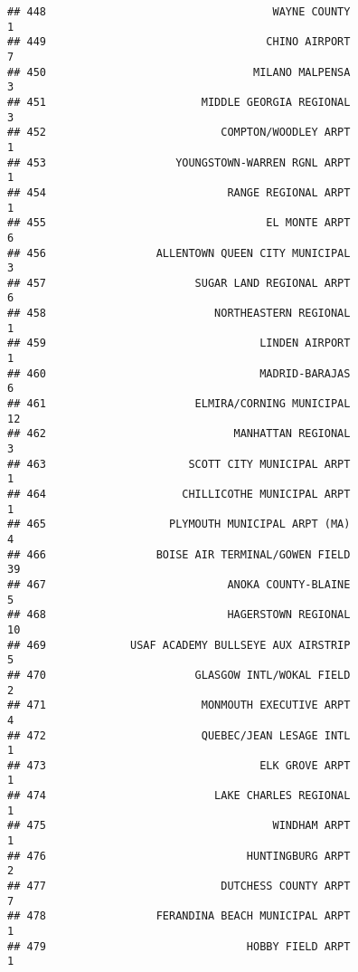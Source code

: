 \documentclass[
]{article}
\begin{document}
\begin{verbatim}
## 448                                   WAYNE COUNTY                           1
## 449                                  CHINO AIRPORT                           7
## 450                                MILANO MALPENSA                           3
## 451                        MIDDLE GEORGIA REGIONAL                           3
## 452                           COMPTON/WOODLEY ARPT                           1
## 453                    YOUNGSTOWN-WARREN RGNL ARPT                           1
## 454                            RANGE REGIONAL ARPT                           1
## 455                                  EL MONTE ARPT                           6
## 456                 ALLENTOWN QUEEN CITY MUNICIPAL                           3
## 457                       SUGAR LAND REGIONAL ARPT                           6
## 458                          NORTHEASTERN REGIONAL                           1
## 459                                 LINDEN AIRPORT                           1
## 460                                 MADRID-BARAJAS                           6
## 461                       ELMIRA/CORNING MUNICIPAL                          12
## 462                             MANHATTAN REGIONAL                           3
## 463                      SCOTT CITY MUNICIPAL ARPT                           1
## 464                     CHILLICOTHE MUNICIPAL ARPT                           1
## 465                   PLYMOUTH MUNICIPAL ARPT (MA)                           4
## 466                 BOISE AIR TERMINAL/GOWEN FIELD                          39
## 467                            ANOKA COUNTY-BLAINE                           5
## 468                            HAGERSTOWN REGIONAL                          10
## 469             USAF ACADEMY BULLSEYE AUX AIRSTRIP                           5
## 470                       GLASGOW INTL/WOKAL FIELD                           2
## 471                        MONMOUTH EXECUTIVE ARPT                           4
## 472                        QUEBEC/JEAN LESAGE INTL                           1
## 473                                 ELK GROVE ARPT                           1
## 474                          LAKE CHARLES REGIONAL                           1
## 475                                   WINDHAM ARPT                           1
## 476                               HUNTINGBURG ARPT                           2
## 477                           DUTCHESS COUNTY ARPT                           7
## 478                 FERANDINA BEACH MUNICIPAL ARPT                           1
## 479                               HOBBY FIELD ARPT                           1

\end{verbatim}
\end{document}
